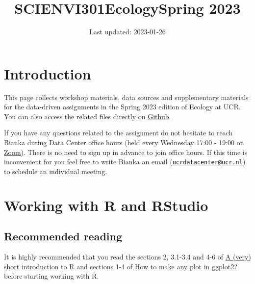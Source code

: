 \documentclass[
]{article}
\title{SCIENVI301EcologySpring 2023}
\author{}
\date{\vspace{-2.5em}Last updated: 2023-01-26}
\begin{document}
\maketitle

{
\setcounter{tocdepth}{3}
\tableofcontents
}
\hfill\break

\hypertarget{introduction}{%
\section{Introduction}\label{introduction}}

This page collects workshop materials, data sources and supplementary
materials for the data-driven assignments in the Spring 2023 edition of
Ecology at UCR. You can also access the related files directly on
\href{https://github.com/ucrdatacenter/projects/tree/main/SCIENVI201/2022h1}{Github}.

If you have any questions related to the assignment do not hesitate to
reach Bianka during Data Center office hours (held every Wednesday 17:00
- 19:00 on
\href{https://universitycollegeroosevelt.zoom.us/j/2831128718?pwd=UmRuSzVqSTZyMndDbDRGSkV5VWFVQT09}{Zoom}).
There is no need to sign up in advance to join office hours. If this
time is inconvenient for you feel free to write Bianka an email
(\href{mailto:ucrdatacenter@ucr.nl}{\nolinkurl{ucrdatacenter@ucr.nl}})
to schedule an individual meeting.

\hfill\break

\hypertarget{working-with-r-and-rstudio}{%
\section{Working with R and RStudio}\label{working-with-r-and-rstudio}}

\hypertarget{recommended-reading}{%
\subsection{Recommended reading}\label{recommended-reading}}

It is highly recommended that you read the sections 2, 3.1-3.4 and 4-6
of
\href{https://github.com/ClaudiaBrauer/A-very-short-introduction-to-R/blob/master/documents/A\%20(very)\%20short\%20introduction\%20to\%20R.pdf}{A
(very) short introduction to R} and sections 1-4 of
\href{http://r-statistics.co/ggplot2-Tutorial-With-R.html\#6.1\%20Make\%20a\%20time\%20series\%20plot\%20(using\%20ggfortify)}{How
to make any plot in ggplot2?} before starting working with R.
\end{document}
